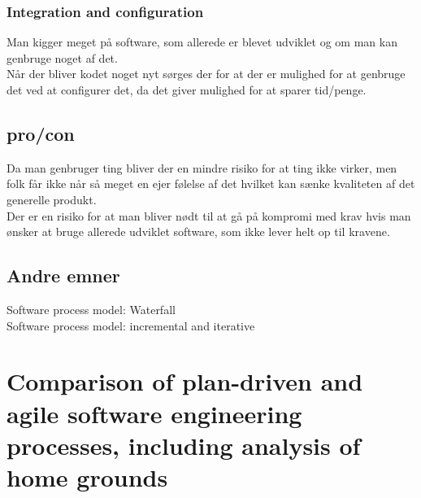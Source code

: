 \documentclass[11pt,a4paper]{article}
\begin{document}
\subsubsection*{Integration and configuration}
Man kigger meget på software, som allerede er blevet udviklet og om man kan genbruge noget af det.\\
Når der bliver kodet noget nyt sørges der for at der er mulighed for at genbruge det ved at configurer det, da det giver mulighed for at sparer tid/penge.
\subsection{pro/con}
Da man genbruger ting bliver der en mindre risiko for at ting ikke virker, men folk får ikke når så meget en ejer følelse af det hvilket kan sænke kvaliteten af det generelle produkt.\\
Der er en risiko for at man bliver nødt til at gå på kompromi med krav hvis man ønsker at bruge allerede udviklet software, som ikke lever helt op til kravene.
\subsection{Andre emner}
Software process model: Waterfall\\
Software process model: incremental and iterative\\
\newpage
\section{Comparison of plan-driven and agile software engineering processes, including analysis of home grounds}
\end{document}
